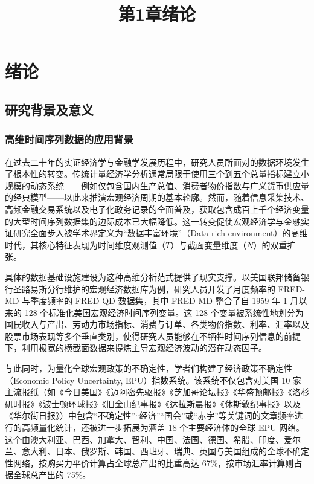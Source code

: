\documentclass[UTF8,a4paper,12pt]{ctexbook}
\title{第1章\quad 绪论}
\author{}
\date{}
\begin{document}
\maketitle

\chapter{绪论}

\section{研究背景及意义}

\subsection{高维时间序列数据的应用背景}

在过去二十年的实证经济学与金融学发展历程中，研究人员所面对的数据环境发生了根本性的转变。传统计量经济学分析通常局限于使用三个到五个总量指标建立小规模的动态系统——例如仅包含国内生产总值、消费者物价指数与广义货币供应量的经典模型——以此来推演宏观经济周期的基本轮廓。然而，随着信息采集技术、高频金融交易系统以及电子化政务记录的全面普及，获取包含成百上千个经济变量的大型时间序列数据集的边际成本已大幅降低。这一转变促使宏观经济学与金融实证研究全面步入被学术界定义为“数据丰富环境”（Data-rich environment）的高维时代，其核心特征表现为时间维度观测值（$T$）与截面变量维度（$N$）的双重扩张。

具体的数据基础设施建设为这种高维分析范式提供了现实支撑。以美国联邦储备银行圣路易斯分行维护的宏观经济数据库为例，研究人员开发了月度频率的 FRED-MD 与季度频率的 FRED-QD 数据集，其中 FRED-MD 整合了自 1959 年 1 月以来的 128 个标准化美国宏观经济时间序列变量。这 128 个变量被系统性地划分为国民收入与产出、劳动力市场指标、消费与订单、各类物价指数、利率、汇率以及股票市场表现等多个垂直类别，使得研究人员能够在不牺牲时间序列信息的前提下，利用极宽的横截面数据来提炼主导宏观经济波动的潜在动态因子。

与此同时，为量化全球宏观政策的不确定性，学者们构建了经济政策不确定性（Economic Policy Uncertainty, EPU）指数系统。该系统不仅包含对美国 10 家主流报纸（如《今日美国》《迈阿密先驱报》《芝加哥论坛报》《华盛顿邮报》《洛杉矶时报》《波士顿环球报》《旧金山纪事报》《达拉斯晨报》《休斯敦纪事报》以及《华尔街日报》）中包含“不确定性”“经济”“国会”或“赤字”等关键词的文章频率进行的高频量化统计，还被进一步拓展为涵盖 18 个主要经济体的全球 EPU 网络。这个由澳大利亚、巴西、加拿大、智利、中国、法国、德国、希腊、印度、爱尔兰、意大利、日本、俄罗斯、韩国、西班牙、瑞典、英国与美国组成的全球不确定性网络，按购买力平价计算占全球总产出的比重高达 67\%，按市场汇率计算则占据全球总产出的 75\%。
\end{document}
